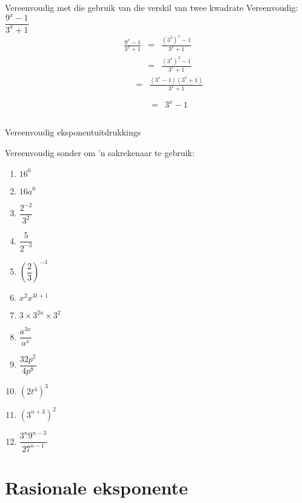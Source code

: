 \begin{wex}
{Vereenvoudig met die gebruik van die verskil van twee kwadrate}
{Vereenvoudig: $\dfrac{9^x-1}{3^x+1}$}
{
\begin{eqnarray*}
 \frac{9^x-1}{3^x+1} & = & \frac{(3^2)^x -1}{3^x+1} \\
		     & = & \frac{(3^x)^2-1}{3^x+1} 
\end{eqnarray*}
\begin{eqnarray*}
 \phantom{\frac{9^x-1}{3^x+1}} & = & \frac{(3^x-1)(3^x+1)}{3^x+1}\\
\end{eqnarray*}
\begin{eqnarray*}
 \phantom{\frac{9^x-1}{3^x+1}} & = & 3^x-1\\
\end{eqnarray*}
}
\end{wex}


\begin{exercises}{Vereenvoudig eksponentuitdrukkings}
{
Vereenvoudig sonder om ’n sakrekenaar te gebruik:
\begin{multicols}{2}
\begin{enumerate}[noitemsep, label=\textbf{\arabic*}., itemsep=5pt]
 \item $16^0$
 \item $16a^0$
 \item $\dfrac{2^{-2}}{3^2}$
 \item $ \dfrac{5}{2^{-3}}$
 \item $ \left(\dfrac{2}{3}\right)^{-3} $
 \item $ x^2 x^{3t+1} $
 \item $ 3 \times 3^{2a} \times 3^2$
 \item $ \dfrac{a^{3x}}{a^x} $
 \item $ \dfrac{32p^2}{4p^8}$
 \item $ (2t^4)^3$
 \item $ (3^{n+3})^2$
 \item $ \dfrac{3^n 9^{n-3}}{27^{n-1}}$
\end{enumerate}
\end{multicols}

 

}
\end{exercises}




\section{Rasionale eksponente}

